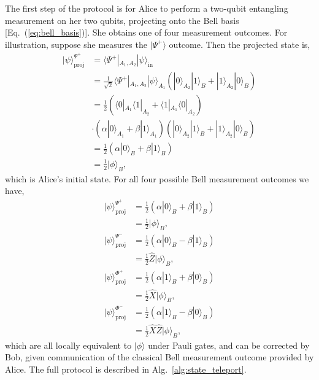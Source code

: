 \documentclass[aps, rmp, twocolumn, amsmath, amssymb, nofootinbib, superscriptaddress, longbibliography, floatfix, table-of-contents, eqsecnum]{revtex4-1}
\newcommand{\bra}[1]{\langle#1|}
\newcommand{\ket}[1]{|#1\rangle}
\begin{document}
The first step of the protocol is for Alice to perform a two-qubit entangling measurement on her two qubits, projecting onto the Bell basis [Eq.~(\ref{eq:bell_basis})]. She obtains one of four measurement outcomes. For illustration, suppose she measures the $\ket{\Psi^+}$ outcome. Then the projected state is,
\begin{align}
\ket\psi_\text{proj}^{\Psi^+} &= \bra{\Psi^+}_{A_1,A_2} \ket\psi_\text{in} \nonumber \\
&= \frac{1}{\sqrt{2}} \bra{\Psi^+}_{A_1,A_2}\ket\psi_{A_1}(\ket{0}_{A_2}\ket{1}_B + \ket{1}_{A_2}\ket{0}_B) \nonumber \\
&= \frac{1}{2} (\bra{0}_{A_1}\bra{1}_{A_2} + \bra{1}_{A_1}\bra{0}_{A_2}) \nonumber \\
&\cdot (\alpha\ket{0}_{A_1}+\beta\ket{1}_{A_1})(\ket{0}_{A_2}\ket{1}_B + \ket{1}_{A_2}\ket{0}_B) \nonumber \\
&= \frac{1}{2} (\alpha \ket{0}_B + \beta \ket{1}_B)\nonumber \\
&= \frac{1}{2} \ket\phi_B,
\end{align}
which is Alice's initial state. For all four possible Bell measurement outcomes we have,
\begin{align}
\ket\psi_\text{proj}^{\Psi^+} &= \frac{1}{2} (\alpha \ket{0}_B + \beta \ket{1}_B) \nonumber \\
&= \frac{1}{2} \ket\phi_B, \nonumber \\
\ket\psi_\text{proj}^{\Psi^-} &= \frac{1}{2} (\alpha \ket{0}_B - \beta \ket{1}_B) \nonumber \\
&= \frac{1}{2} \hat{Z}\ket\phi_B, \nonumber \\
\ket\psi_\text{proj}^{\Phi^+} &= \frac{1}{2} (\alpha \ket{1}_B + \beta \ket{0}_B) \nonumber \\
&= \frac{1}{2} \hat{X} \ket\phi_B, \nonumber \\
\ket\psi_\text{proj}^{\Phi^-} &= \frac{1}{2} (\alpha \ket{1}_B - \beta \ket{0}_B) \nonumber \\
&= \frac{1}{2} \hat{X}\hat{Z}\ket\phi_B,
\end{align}
which are all locally equivalent to $\ket\phi$ under Pauli gates, and can be corrected by Bob, given communication of the classical Bell measurement outcome provided by Alice. The full protocol is described in Alg.~\ref{alg:state_teleport}.
\end{document}

